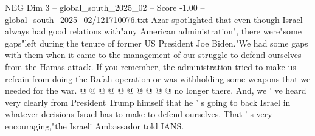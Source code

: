 \begin{textsample}{NEG Dim 3 – global\_south\_2025\_02 – Score -1.00 – global\_south\_2025\_02/121710076.txt}
Azar spotlighted that even though Israel always had good relations with"any American administration", there were"some gaps"left during the tenure of former US President Joe Biden."We had some gaps with them when it came to the management of our struggle to defend ourselves from the Hamas attack.
If you remember, the administration tried to make us refrain from doing the Rafah operation or was withholding some weapons that we needed for the war. @ @ @ @ @ @ @ @ @ @ no longer there.
And, we ' ve heard very clearly from President Trump himself that he ' s going to back Israel in whatever decisions Israel has to make to defend ourselves.
That ' s very encouraging,"the Israeli Ambassador told IANS.

\end{textsample}
